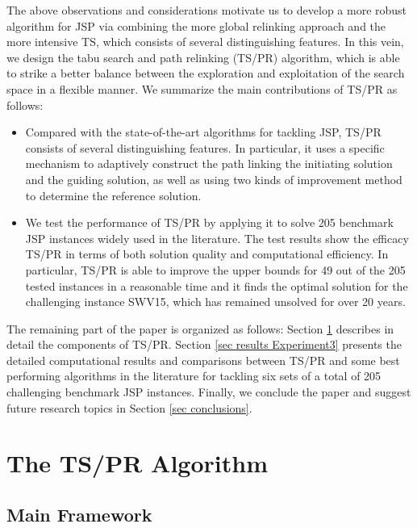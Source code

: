 \documentclass[authoryear,12pt]{elsarticle}
\begin{document}
The above observations and considerations motivate us to develop a more robust algorithm for JSP via combining the more global relinking approach and the more intensive TS, which consists of several distinguishing features. In this vein, we design the tabu search and path relinking (TS/PR) algorithm, which is able to strike a better balance between the exploration and exploitation of the search space in a flexible manner. We summarize the main contributions of TS/PR as follows:

\begin{itemize}
\item Compared with the state-of-the-art algorithms for tackling JSP, TS/PR consists of several distinguishing features. In particular, it uses a specific mechanism to adaptively construct the path linking the initiating solution and the guiding solution, as well as using two kinds of improvement method to determine the reference solution.

\item We test the performance of TS/PR by applying it to solve 205 benchmark JSP instances widely used in the literature. The test results show the efficacy TS/PR in terms of both solution quality and computational efficiency. In particular, TS/PR is able to improve the upper bounds for 49 out of the 205 tested instances in a reasonable time and it finds the optimal solution for the challenging instance SWV15, which has remained unsolved for over 20 years.
\end{itemize}

The remaining part of the paper is organized as follows: Section \ref{Sec TS/PR} describes in detail the components of TS/PR. Section \ref{sec results Experiment3} presents the detailed computational results and comparisons between TS/PR and some best performing algorithms in the literature for tackling six sets of a total of 205 challenging benchmark JSP instances. Finally, we conclude the paper and suggest future research topics in Section \ref{sec conclusions}.

\section{The TS/PR Algorithm}
\label{Sec TS/PR}

\subsection{Main Framework}
\label{subsec sol main scheme}
\end{document}
